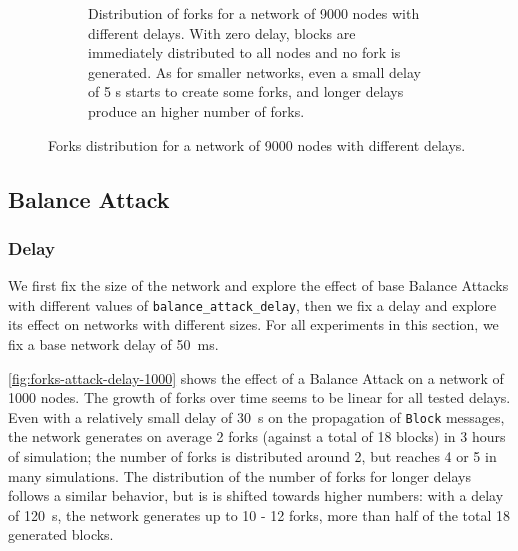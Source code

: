 \begin{figure}[h]
\begin{subfigure}{\textwidth}
		\vspace*{0.25cm}
		\caption{
			Distribution of forks for a network of \num{9000} nodes with different delays.
			With zero delay, blocks are immediately distributed to all nodes and no fork is generated.
			As for smaller networks, even a small delay of \num{5} s starts to create some forks, and longer delays produce an higher number of forks.
		}
		\vspace*{0.25cm}
	\end{subfigure}
	\caption[Forks distribution for a network of 9000 nodes with different delays]{
		Forks distribution for a network of \num{9000} nodes with different delays.
	}
	\label{fig:forks-delay-9000}
\end{figure}

\subsection{Balance Attack}

\subsubsection{Delay}
We first fix the size of the network and explore the effect of base Balance Attacks with different values of \texttt{balance\_attack\_delay}, then we fix a delay and explore its effect on networks with different sizes.
For all experiments in this section, we fix a base network delay of \SI{50}{\milli\second}.

\medskip
\cref{fig:forks-attack-delay-1000} shows the effect of a Balance Attack on a network of \num{1000} nodes.
The growth of forks over time seems to be linear for all tested delays.
Even with a relatively small delay of \SI{30}{\second} on the propagation of \texttt{Block} messages, the network generates on average \num{2} forks (against a total of \num{18} blocks) in \num{3} hours of simulation;
the number of forks is distributed around \num{2}, but reaches \num{4} or \num{5} in many simulations.
The distribution of the number of forks for longer delays follows a similar behavior, but is is shifted towards higher numbers:
with a delay of \SI{120}{\second}, the network generates up to \num{10} - \num{12} forks, more than half of the total \num{18} generated blocks.

